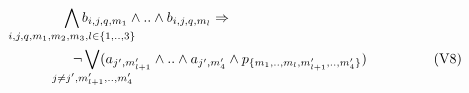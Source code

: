 \begin{align}
	\bigwedge\limits_{\mathclap{i,j,q,m_1,m_2,m_3, l \in \{1,..,3\}}} b_{i,j,q,m_1} \land ..\land b_{i,j,q,m_l} \limplies
\mspace{300mu}
  \notag \\
	\qquad \qquad \qquad \qquad
	\neg
\bigvee_{\mathclap{j \neq j^{\prime}, m_{l+1}^{\prime},..,m_{4}^{\prime}}} ( a_{j^{\prime},m_{l+1}^{\prime}} \land .. \land a_{j^{\prime},m_4^{\prime}} \land p_{\{m_1,..,m_l,m^{\prime}_{l+1},..,m^{\prime}_4\}})
\mspace{50mu}
  \tag{V8}\label{eq:fuse2}  
\end{align}





